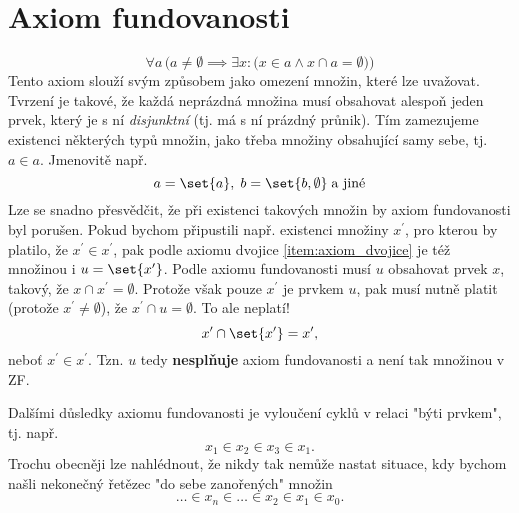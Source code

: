 \section{Axiom fundovanosti}\label{sec:axiom_fundovanosti}
\begin{equation*}
    \forall a\,\Big(a\neq\emptyset \implies \exists x:\big(x\in a \land x\cap a=\emptyset\big)\Big)
\end{equation*}
Tento axiom slouží svým způsobem jako omezení množin, které lze uvažovat. Tvrzení je takové, že každá neprázdná množina musí obsahovat alespoň jeden prvek, který je s ní \emph{disjunktní} (tj. má s ní prázdný průnik). Tím zamezujeme existenci některých typů množin, jako třeba množiny obsahující samy sebe, tj. $a\in a$. Jmenovitě např.
\begin{equation*}
    a=\set{a},\;b=\set{b,\emptyset}\;\text{a jiné}
\end{equation*}
Lze se snadno přesvědčit, že při existenci takových množin by axiom fundovanosti byl porušen. Pokud bychom připustili např. existenci množiny $x^\prime$, pro kterou by platilo, že $x^\prime\in x^\prime$, pak podle axiomu dvojice \ref{item:axiom_dvojice} je též množinou i $u=\set{x^\prime}$. Podle axiomu fundovanosti musí $u$ obsahovat prvek $x$, takový, že $x\cap x^\prime=\emptyset$. Protože však pouze $x^\prime$ je prvkem $u$, pak musí nutně platit (protože $x^\prime\neq\emptyset$), že $x^\prime\cap u=\emptyset$. To ale neplatí!
\begin{equation*}
    x^\prime\cap\set{x^\prime}=x^\prime,
\end{equation*}
neboť $x^\prime\in x^\prime$. Tzn. $u$ tedy \textbf{nesplňuje} axiom fundovanosti a není tak množinou v ZF.\par
Dalšími důsledky axiomu fundovanosti je vyloučení cyklů v relaci "býti prvkem", tj. např.
\begin{equation*}
    x_1\in x_2\in x_3\in x_1.
\end{equation*}
Trochu obecněji lze nahlédnout, že nikdy tak nemůže nastat situace, kdy bychom našli nekonečný řetězec "do sebe zanořených" množin
\begin{equation*}
    \dots \in x_n\in \dots\in x_2\in x_1\in x_0.
\end{equation*}
